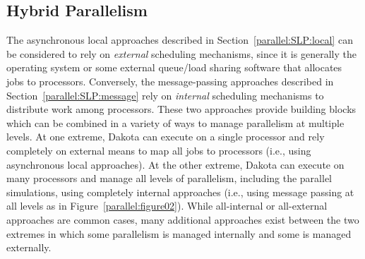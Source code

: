 \subsection{Hybrid Parallelism}\label{parallel:SLP:hybrid}

The asynchronous local approaches described in
Section~\ref{parallel:SLP:local} can be considered to rely on
\emph{external} scheduling mechanisms, since it is generally the
operating system or some external queue/load sharing software that
allocates jobs to processors. Conversely, the message-passing
approaches described in Section~\ref{parallel:SLP:message} rely on
\emph{internal} scheduling mechanisms to distribute work among
processors. These two approaches provide building blocks which can be
combined in a variety of ways to manage parallelism at multiple
levels. At one extreme, Dakota can execute on a single processor and
rely completely on external means to map all jobs to processors (i.e.,
using asynchronous local approaches). At the other extreme, Dakota can
execute on many processors and manage all levels of parallelism,
including the parallel simulations, using completely internal
approaches (i.e., using message passing at all levels as in
Figure~\ref{parallel:figure02}). While all-internal or all-external
approaches are common cases, many additional approaches exist between
the two extremes in which some parallelism is managed internally and
some is managed externally.


